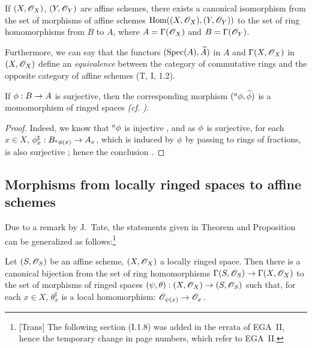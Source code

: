 \begin{cor}[1.7.4]
\label{1.1.7.4}
If $(X,\mathscr{O}_X)$, $(Y,\mathscr{O}_Y)$ are affine schemes, there exists a canonical isomorphism from
the set of morphisms of affine schemes ${\mathop{\mathrm{Hom}}\nolimits}((X,\mathscr{O}_X),(Y,\mathscr{O}_Y))$ to the set of
ring homomorphisms from $B$ to $A$, where $A=\Gamma(\mathscr{O}_X)$ and $B=\Gamma(\mathscr{O}_Y)$.
\end{cor}

Furthermore, we can say that the functors $({\mathop{\mathrm{Spec}}\nolimits}(A),\widetilde{A})$ in $A$ and
$\Gamma(X,\mathscr{O}_X)$ in $(X,\mathscr{O}_X)$ define an {\em equivalence} between the category of
commutative rings and the opposite category of affine schemes (T, I, 1.2).

\begin{cor}[1.7.5]
\label{1.1.7.5}
If $\phi:B\to A$ is surjective, then the corresponding morphism
$({}^a\phi,\widetilde{\phi})$ is a momomorphism of ringed spaces
{\em (cf. )}.
\end{cor}

\begin{proof}
\label{proof-1.1.7.5}
Indeed, we know that ${}^a\phi$ is injective , and as $\phi$ is
surjective, for each $x\in X$, $\phi_x^\sharp:B_{{}^a\phi(x)}\to A_x$, which is induced
by $\phi$ by passing to rings of fractions, is also surjective ; hence
the conclusion .
\end{proof}

\subsection{Morphisms from locally ringed spaces to affine schemes}
\label{subsection-morphisms-lrs-to-affine-schemes}

Due to a remark by J.~Tate, the statements given in Theorem 
and Proposition 
can be generalized as follows:\footnote{[Trans] The following section (I.1.8) was added in
the errata of EGA~II, hence the temporary change in page numbers, which refer to EGA~II.}

\begin{prop}[1.8.1]
\label{1.1.8.1}
Let $(S,\mathscr{O}_S)$ be an affine scheme, $(X,\mathscr{O}_X)$ a locally ringed space. Then there is a
canonical bijection from the set of ring homomorphisms
$\Gamma(S,\mathscr{O}_S)\to\Gamma(X,\mathscr{O}_X)$ to the set of morphisms of ringed spaces
$(\psi,\theta):(X,\mathscr{O}_X)\to(S,\mathscr{O}_S)$ such that, for each $x\in X$, $\theta_x^\sharp$ is a
local homomorphism: $\mathscr{O}_{\psi(x)}\to\mathscr{O}_x$.
\end{prop}

